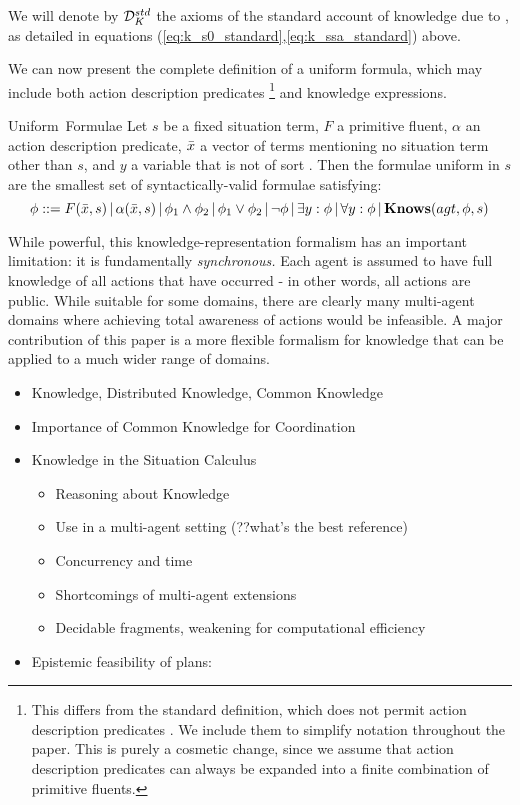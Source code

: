\medskip{}


We will denote by $\mathcal{D}_{K}^{std}$ the axioms of the standard account
of knowledge due to \cite{scherl03sc_knowledge}, as detailed in equations
(\ref{eq:k_s0_standard},\ref{eq:k_ssa_standard}) above.

We can now present the complete definition of a uniform formula, which
may include both action description predicates%
\footnote{This differs from the standard definition, which does not permit action
description predicates \cite{pirri99contributions_sitcalc}. We include
them to simplify notation throughout the paper. This is purely a cosmetic
change, since we assume that action description predicates can always
be expanded into a finite combination of primitive fluents.%
} and knowledge expressions.

Uniform~Formulae Let $s$ be a fixed situation term, $F$ a primitive
fluent, $\alpha$ an action description predicate, $\bar{x}$ a vector
of terms mentioning no situation term other than $s$, and $y$ a
variable that is not of sort . Then the formulae uniform
in $s$ are the smallest set of syntactically-valid formulae satisfying:\[
\phi::=F(\bar{x},s)\,|\,\alpha(\bar{x},s)\,|\,\phi_{1}\wedge\phi_{2}\,|\,\phi_{1}\vee\phi_{2}\,|\,\neg\phi\,|\,\exists y:\phi\,|\,\forall y:\phi\,|\,\mathbf{Knows}(agt,\phi,s)\]


While powerful, this knowledge-representation formalism has an important
limitation: it is fundamentally \emph{synchronous.} Each agent is
assumed to have full knowledge of all actions that have occurred -
in other words, all actions are public. While suitable for some domains,
there are clearly many multi-agent domains where achieving total awareness
of actions would be infeasible. A major contribution of this paper
is a more flexible formalism for knowledge that can be applied to
a much wider range of domains.

\begin{itemize}
\item Knowledge, Distributed Knowledge, Common Knowledge \cite{halpern90knowledge_distrib,fagin95} 
\item Importance of Common Knowledge for Coordination 
\item Knowledge in the Situation Calculus

\begin{itemize}
\item Reasoning about Knowledge \cite{moore80know_act,scherl03sc_knowledge} 
\item Use in a multi-agent setting (??what's the best reference) 
\item Concurrency and time \cite{scherl03conc_knowledge} 
\item Shortcomings of multi-agent extensions 
\item Decidable fragments, weakening for computational efficiency 
\end{itemize}
\item Epistemic feasibility of plans: \cite{giacomo04sem_delib_indigolog,Lesperance01epi_feas_casl} 
\end{itemize}

